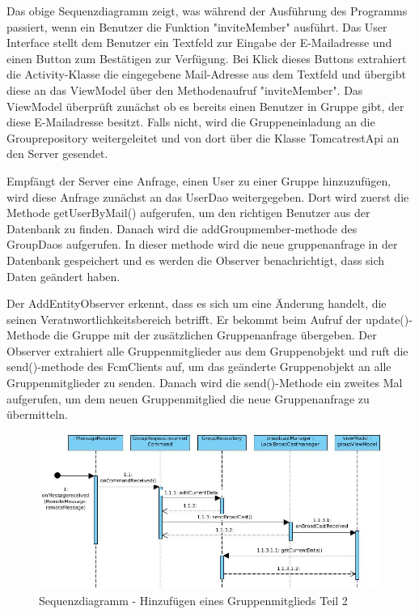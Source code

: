 Das obige Sequenzdiagramm zeigt, was während der Ausführung des Programms passiert, wenn ein Benutzer die Funktion "inviteMember" ausführt. Das User Interface stellt dem Benutzer ein Textfeld zur Eingabe der E-Mailadresse und einen Button zum Bestätigen zur Verfügung. Bei Klick dieses Buttons extrahiert die Activity-Klasse die eingegebene Mail-Adresse aus dem Textfeld und übergibt diese an das ViewModel über den Methodenaufruf "inviteMember". Das ViewModel überprüft zunächst ob es bereits einen Benutzer in Gruppe gibt, der diese E-Mailadresse besitzt. Falls nicht, wird die Gruppeneinladung an die Grouprepository weitergeleitet und von dort über die Klasse TomcatrestApi an den Server gesendet.

Empfängt der Server eine Anfrage, einen User zu einer Gruppe hinzuzufügen, wird diese Anfrage zunächst an das UserDao weitergegeben. Dort wird zuerst die Methode getUserByMail() aufgerufen, um den richtigen Benutzer aus der Datenbank zu finden. Danach wird die addGroupmember-methode des GroupDaos aufgerufen. In dieser methode wird die neue gruppenanfrage in der Datenbank gespeichert und es werden die Observer benachrichtigt, dass sich Daten geändert haben.

Der AddEntityObserver erkennt, dass es sich um eine Änderung handelt, die seinen Veratnwortlichkeitsbereich betrifft. Er bekommt beim Aufruf der update()-Methode die Gruppe mit der zusätzlichen Gruppenanfrage übergeben. Der Observer extrahiert alle Gruppenmitglieder aus dem Gruppenobjekt und ruft die send()-methode des FcmClients auf, um das geänderte Gruppenobjekt an alle Gruppenmitglieder zu senden. Danach wird die send()-Methode ein zweites Mal aufgerufen, um dem neuen Gruppenmitglied die neue Gruppenanfrage zu übermitteln.

\begin{figure}[H]
	\centering
	\includegraphics[width=1\textwidth]{../Sequenzdiagramme/addMember2.jpg}
	\caption{Sequenzdiagramm - Hinzufügen eines Gruppenmitglieds Teil 2}
\end{figure}


